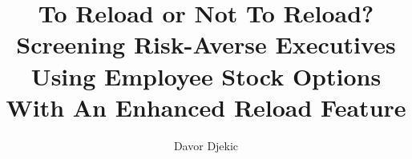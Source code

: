 \documentclass[12pt]{article}
\title{To Reload or Not To Reload?\\ Screening Risk-Averse Executives Using Employee Stock Options With An Enhanced Reload Feature}
\author{Davor Djekic}
\begin{document}



    

  
    \nocite{*}

\end{document}
